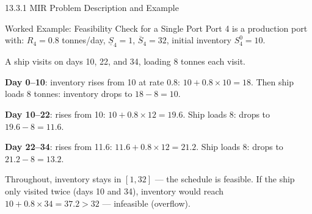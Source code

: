 \documentclass[aspectratio=169,10pt]{beamer}
\begin{document}
\begin{frame}[allowframebreaks]{13.3.1 MIR Problem Description and Example}
  \begin{exampleblock}{Worked Example: Feasibility Check for a Single Port}
    Port 4 is a production port with:
    $R_4 = 0.8$ tonnes/day, $\underline{S}_4 = 1$, $\overline{S}_4 = 32$,
    initial inventory $S_4^0 = 10$.

    A ship visits on days 10, 22, and 34, loading 8 tonnes each visit.

    \medskip
    \textbf{Day 0--10}: inventory rises from 10 at rate 0.8: $10 + 0.8 \times 10 = 18$.
    Then ship loads 8 tonnes: inventory drops to $18 - 8 = 10$.

    \textbf{Day 10--22}: rises from 10: $10 + 0.8 \times 12 = 19.6$.
    Ship loads 8: drops to $19.6 - 8 = 11.6$.

    \textbf{Day 22--34}: rises from 11.6: $11.6 + 0.8 \times 12 = 21.2$.
    Ship loads 8: drops to $21.2 - 8 = 13.2$.

    Throughout, inventory stays in $[1, 32]$ --- the schedule is feasible.
    If the ship only visited twice (days 10 and 34), inventory would reach
    $10 + 0.8 \times 34 = 37.2 > 32$ --- infeasible (overflow).
  \end{exampleblock}
\end{frame}
\end{document}
